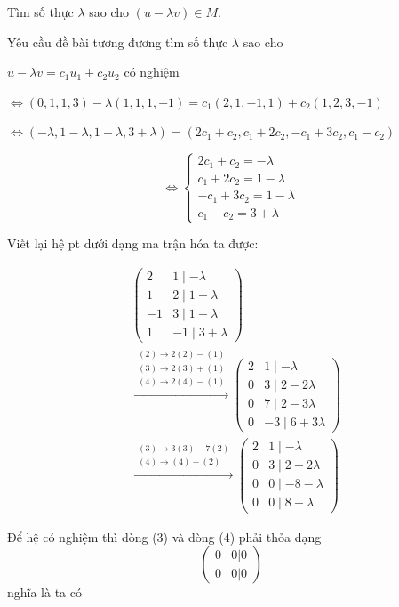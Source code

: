 \documentclass[12pt,a4paper]{article}
\begin{document}
Tìm số thực $\lambda$ sao cho
$(u - \lambda v) \in M$.

Yêu cầu đề bài tương đương tìm số thực
$\lambda$ sao cho

$u - \lambda v = c_1u_1 + c_2u_2$ có nghiệm

$\Leftrightarrow (0, 1, 1, 3) - \lambda(1, 1, 1, -1) = c_1(2, 1, -1, 1) + c_2(1, 2, 3, -1)$

$\Leftrightarrow (-\lambda, 1 - \lambda, 1 - \lambda, 3 + \lambda) = (2c_1 + c_2, c_1 + 2c_2, -c_1 + 3c_2, c_1 - c_2)$

\[\Leftrightarrow \begin{cases} 2c_1 + c_2 = -\lambda \\ c_1 + 2c_2 = 1 - \lambda \\ -c_1 + 3c_2 = 1 - \lambda \\ c_1 - c_2 = 3 + \lambda \end{cases}\]

Viết lại hệ pt dưới dạng ma trận hóa ta được:

\begin{align*}
&\begin{pmatrix} 2 & 1 \mid -\lambda \\ 1 & 2 \mid 1 - \lambda \\ -1 & 3 \mid 1 - \lambda \\ 1 & -1 \mid 3 + \lambda \end{pmatrix} \\
&\xrightarrow{\substack{(2) \to 2(2) - (1) \\ (3) \to 2(3) + (1) \\ (4) \to 2(4) - (1)}} \begin{pmatrix} 2 & 1 \mid -\lambda \\ 0 & 3 \mid 2 - 2\lambda \\ 0 & 7 \mid 2 - 3\lambda \\ 0 & -3 \mid 6 + 3\lambda \end{pmatrix} \\
&\xrightarrow{\substack{(3) \to 3(3) - 7(2) \\ (4) \to (4) + (2)}} \begin{pmatrix} 2 & 1 \mid -\lambda \\ 0 & 3 \mid 2 - 2\lambda \\ 0 & 0 \mid -8 - \lambda \\ 0 & 0 \mid 8 + \lambda \end{pmatrix}
\end{align*}

Để hệ có nghiệm thì dòng (3) và dòng (4) phải thỏa dạng
\[\begin{pmatrix} 0 & 0 | 0 \\ 0 & 0 | 0 \end{pmatrix}\] nghĩa là ta có
\end{document}
